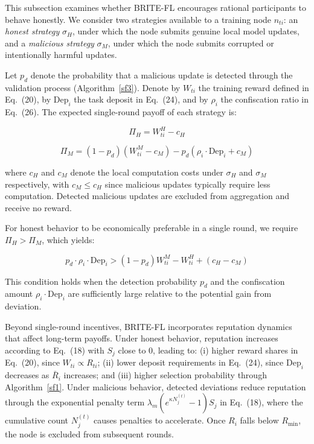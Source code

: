 \documentclass[a4paper]{cas-dc}
\begin{document}
This subsection examines whether BRITE-FL encourages rational participants to behave honestly. We consider two strategies available to a training node $n_{ti}$: an \emph{honest strategy} $\sigma_H$, under which the node submits genuine local model updates, and a \emph{malicious strategy} $\sigma_M$, under which the node submits corrupted or intentionally harmful updates.

Let $p_d$ denote the probability that a malicious update is detected through the validation process (Algorithm~\ref{sf3}). Denote by $W_{ti}$ the training reward defined in Eq.~(20), by $\mathrm{Dep}_i$ the task deposit in Eq.~(24), and by $\rho_i$ the confiscation ratio in Eq.~(26). The expected single-round payoff of each strategy is:

\begin{equation}
    \Pi_H = W_{ti}^{H} - c_H
\end{equation}

\begin{equation}
    \Pi_M = (1-p_d)(W_{ti}^{M} - c_M) - p_d(\rho_i \cdot \mathrm{Dep}_i + c_M)
\end{equation}

\noindent where $c_H$ and $c_M$ denote the local computation costs under $\sigma_H$ and $\sigma_M$ respectively, with $c_M \le c_H$ since malicious updates typically require less computation. Detected malicious updates are excluded from aggregation and receive no reward.

For honest behavior to be economically preferable in a single round, we require $\Pi_H > \Pi_M$, which yields:

\begin{equation}\label{eq:ic_condition}
    p_d \cdot \rho_i \cdot \mathrm{Dep}_i > (1-p_d) W_{ti}^{M} - W_{ti}^{H} + (c_H - c_M)
\end{equation}

This condition holds when the detection probability $p_d$ and the confiscation amount $\rho_i \cdot \mathrm{Dep}_i$ are sufficiently large relative to the potential gain from deviation.

Beyond single-round incentives, BRITE-FL incorporates reputation dynamics that affect long-term payoffs. Under honest behavior, reputation increases according to Eq.~(18) with $S_j$ close to 0, leading to: (i) higher reward shares in Eq.~(20), since $W_{ti} \propto R_{ti}$; (ii) lower deposit requirements in Eq.~(24), since $\mathrm{Dep}_i$ decreases as $\bar{R}_i$ increases; and (iii) higher selection probability through Algorithm~\ref{sf1}. Under malicious behavior, detected deviations reduce reputation through the exponential penalty term $\lambda_m(e^{\kappa N_j^{(t)}}-1)S_j$ in Eq.~(18), where the cumulative count $N_j^{(t)}$ causes penalties to accelerate. Once $R_i$ falls below $R_{\min}$, the node is excluded from subsequent rounds.
\end{document}
